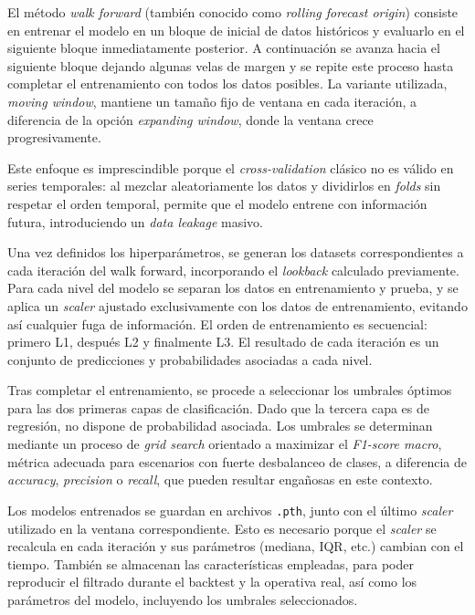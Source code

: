 El método \textit{walk forward} (también conocido como \textit{rolling forecast origin}) consiste en entrenar el modelo en un bloque de inicial de
datos históricos y evaluarlo en el siguiente bloque inmediatamente posterior. A continuación se avanza hacia el siguiente bloque dejando algunas
velas de margen y se repite este proceso hasta completar el entrenamiento con todos los datos posibles. La variante utilizada, \textit{moving window},
mantiene un tamaño fijo de ventana en cada iteración, a diferencia de la opción \textit{expanding window}, donde la ventana crece progresivamente.

Este enfoque es imprescindible porque el \textit{cross-validation} clásico no es válido en series temporales: al mezclar aleatoriamente los datos y
dividirlos en \textit{folds} sin respetar el orden temporal, permite que el modelo entrene con información futura, introduciendo un
\textit{data leakage} masivo.



Una vez definidos los hiperparámetros, se generan los datasets correspondientes a cada iteración del walk forward, incorporando el \textit{lookback}
calculado previamente. Para cada nivel del modelo se separan los datos en entrenamiento y prueba, y se aplica un \textit{scaler} ajustado
exclusivamente con los datos de entrenamiento, evitando así cualquier fuga de información. El orden de entrenamiento es secuencial: primero L1,
después L2 y finalmente L3. El resultado de cada iteración es un conjunto de predicciones y probabilidades asociadas a cada nivel.

Tras completar el entrenamiento, se procede a seleccionar los umbrales óptimos para las dos primeras capas de clasificación. Dado que la tercera capa
es de regresión, no dispone de probabilidad asociada. Los umbrales se determinan mediante un proceso de \textit{grid search} orientado a maximizar el
\textit{F1-score macro}, métrica adecuada para escenarios con fuerte desbalanceo de clases, a diferencia de \textit{accuracy}, \textit{precision} o
\textit{recall}, que pueden resultar engañosas en este contexto.

Los modelos entrenados se guardan en archivos \texttt{.pth}, junto con el último \textit{scaler} utilizado en la ventana correspondiente. Esto es
necesario porque el \textit{scaler} se recalcula en cada iteración y sus parámetros (mediana, IQR, etc.) cambian con el tiempo. También se almacenan
las características empleadas, para poder reproducir el filtrado durante el backtest y la operativa real, así como los parámetros del modelo,
incluyendo los umbrales seleccionados.

